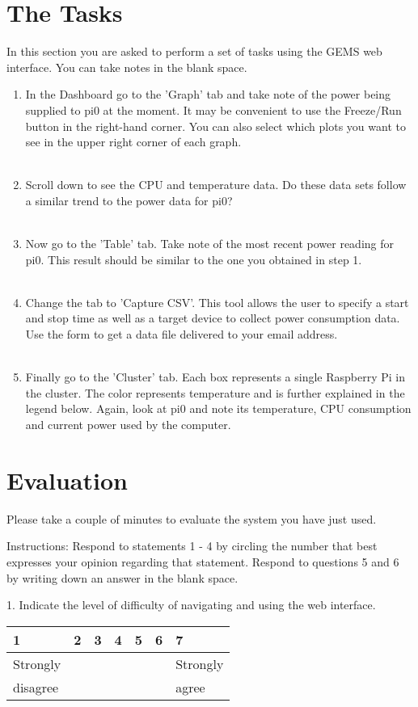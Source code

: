 \documentclass[12pt]{article}
\begin{document}
\section{The Tasks}
In this section you are asked to perform a set of tasks using the GEMS web interface. You can take notes in the blank space. 
\begin{enumerate}
  \item In the Dashboard go to the 'Graph' tab and take note of the power being supplied to pi0 at the moment. It may be convenient to use the Freeze/Run button in the right-hand corner. You can also select which plots you want to see in the upper right corner of each graph.\\\\
  \item Scroll down to see the CPU and temperature data. Do these data sets follow a similar trend to the power data for pi0?\\\\
  \item Now go to the 'Table' tab. Take note of the most recent power reading for pi0. This result should be similar to the one you obtained in step 1.\\\\
  \item Change the tab to 'Capture CSV'. This tool allows the user to specify a start and stop time as well as a target device to collect power consumption data. Use the form to get a data file delivered to your email address.\\\\
  \item Finally go to the 'Cluster' tab. Each box represents a single Raspberry Pi in the cluster. The color represents temperature and is further explained in the legend below. Again, look at pi0 and note its temperature, CPU consumption and current power used by the computer.
\end{enumerate}
\newpage
\section{Evaluation}
Please take a couple of minutes to evaluate the system you have just used.

Instructions: Respond to statements 1 - 4 by circling the number that best expresses your opinion regarding that statement. Respond to questions 5 and 6 by writing down an answer in the blank space.

1. Indicate the level of difficulty of navigating and using the web interface.
\vspace{-4ex}
\begin{center}
\begin{tabular}{
|m{4em}|m{4em}|m{4em}|m{4em}|m{4em}|m{4em}|m{4em}| }
\hline
 1 & 2 & 3 & 4 & 5 & 6 & 7 \\ 
 \hline
 Strongly &&&&&& Strongly\\
 disagree &&&&&& agree\\
  \hline
\end{tabular}
\end{center}
\end{document}
